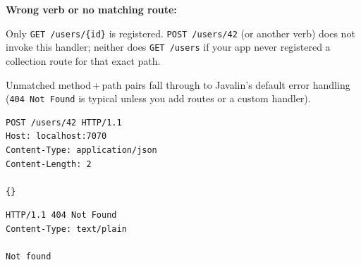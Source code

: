 \begin{solution}
  \noindent\textbf{Wrong verb or no matching route:}\par
  \noindent Only \texttt{GET /users/\{id\}} is registered. \texttt{POST /users/42} (or another verb) does not invoke this handler; neither does \texttt{GET /users} if your app never registered a collection route for that exact path.\par
  \noindent Unmatched method\,+\,path pairs fall through to Javalin's default error handling (\texttt{404 Not Found} is typical unless you add routes or a custom handler).\par
  \begin{httpexchange}
\begin{lstlisting}[style=http]
POST /users/42 HTTP/1.1
Host: localhost:7070
Content-Type: application/json
Content-Length: 2

{}
\end{lstlisting}
\httpmidarrows
\begin{lstlisting}[style=http]
HTTP/1.1 404 Not Found
Content-Type: text/plain

Not found
\end{lstlisting}
  \end{httpexchange}
\end{solution}

\newpage

